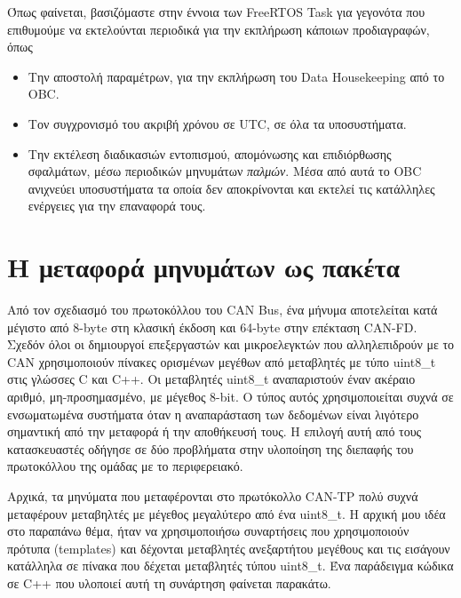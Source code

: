 \documentclass[a4paper,nobib,justified]{tufte-book}
\begin{document}

Όπως φαίνεται, βασιζόμαστε στην έννοια των FreeRTOS Task για γεγονότα που επιθυμούμε να εκτελούνται περιοδικά για την εκπλήρωση κάποιων προδιαγραφών, όπως
\begin{itemize}
	\item Την αποστολή παραμέτρων, για την εκπλήρωση του Data Housekeeping από το OBC.
	\item Τον συγχρονισμό του ακριβή χρόνου σε UTC, σε όλα τα υποσυστήματα.
	\item Την εκτέλεση διαδικασιών εντοπισμού, απομόνωσης και επιδιόρθωσης σφαλμάτων, μέσω περιοδικών μηνυμάτων \emph{παλμών}. Μέσα από αυτά το OBC ανιχνεύει υποσυστήματα τα οποία δεν αποκρίνονται και εκτελεί τις κατάλληλες ενέργειες για την επαναφορά τους. 
\end{itemize}

\clearpage
\section{Η μεταφορά μηνυμάτων ως πακέτα}

Από τον σχεδιασμό του πρωτοκόλλου του CAN Bus, ένα μήνυμα αποτελείται κατά μέγιστο από 8-byte στη κλασική έκδοση και 64-byte στην επέκταση CAN-FD. Σχεδόν όλοι οι δημιουργοί επεξεργαστών και μικροελεγκτών που αλληλεπιδρούν με το CAN χρησιμοποιούν πίνακες ορισμένων μεγέθων από μεταβλητές με τύπο uint8\_t στις γλώσσες C και C++. Οι μεταβλητές uint8\_t αναπαριστούν έναν ακέραιο αριθμό, μη-προσημασμένο, με μέγεθος 8-bit. Ο τύπος αυτός χρησιμοποιείται συχνά σε ενσωματωμένα συστήματα όταν η αναπαράσταση των δεδομένων είναι λιγότερο σημαντική από την μεταφορά ή την αποθήκευσή τους. Η επιλογή αυτή από τους κατασκευαστές οδήγησε σε δύο προβλήματα στην υλοποίηση της διεπαφής του πρωτοκόλλου της ομάδας με το περιφερειακό.

Αρχικά, τα μηνύματα που μεταφέρονται στο πρωτόκολλο CAN-TP πολύ συχνά μεταφέρουν μεταβηλτές με μέγεθος μεγαλύτερο από ένα uint8\_t. Η αρχική μου ιδέα στο παραπάνω θέμα, ήταν να χρησιμοποιήσω συναρτήσεις που χρησιμοποιούν πρότυπα (templates) και δέχονται μεταβλητές ανεξαρτήτου μεγέθους και τις εισάγουν κατάλληλα σε πίνακα που δέχεται μεταβλητές τύπου uint8\_t. Ένα παράδειγμα κώδικα σε C++ που υλοποιεί αυτή τη συνάρτηση φαίνεται παρακάτω. 
\end{document}
